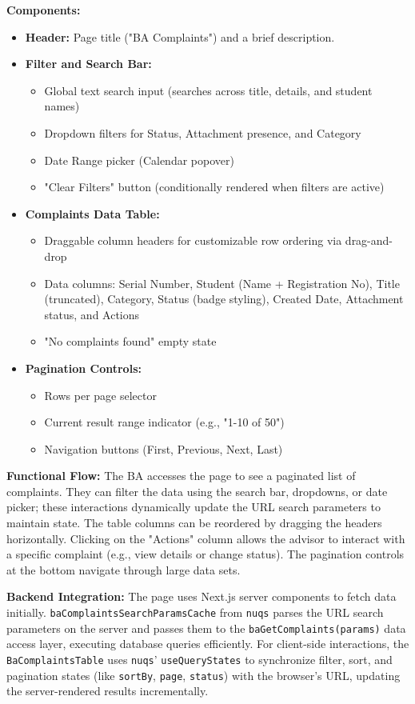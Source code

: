 \textbf{Components:}
\begin{itemize}
    \item \textbf{Header:} Page title ("BA Complaints") and a brief description.
    \item \textbf{Filter and Search Bar:}
    \begin{itemize} \item Global text search input (searches across title, details, and student names) \item Dropdown filters for Status, Attachment presence, and Category \item Date Range picker (Calendar popover) \item "Clear Filters" button (conditionally rendered when filters are active) \end{itemize} \item \textbf{Complaints Data Table:} \begin{itemize} \item Draggable column headers for customizable row ordering via drag-and-drop \item Data columns: Serial Number, Student (Name + Registration No), Title (truncated), Category, Status (badge styling), Created Date, Attachment status, and Actions \item "No complaints found" empty state \end{itemize} \item \textbf{Pagination Controls:} \begin{itemize} \item Rows per page selector \item Current result range indicator (e.g., "1-10 of 50") \item Navigation buttons (First, Previous, Next, Last) \end{itemize} \end{itemize}

\textbf{Functional Flow:} The BA accesses the page to see a paginated list of complaints. They can filter the data using the search bar, dropdowns, or date picker; these interactions dynamically update the URL search parameters to maintain state. The table columns can be reordered by dragging the headers horizontally. Clicking on the "Actions" column allows the advisor to interact with a specific complaint (e.g., view details or change status). The pagination controls at the bottom navigate through large data sets.

\textbf{Backend Integration:} The page uses Next.js server components to fetch data initially. \texttt{baComplaintsSearchParamsCache} from \texttt{nuqs} parses the URL search parameters on the server and passes them to the \texttt{baGetComplaints(params)} data access layer, executing database queries efficiently. For client-side interactions, the \texttt{BaComplaintsTable} uses \texttt{nuqs}' \texttt{useQueryStates} to synchronize filter, sort, and pagination states (like \texttt{sortBy}, \texttt{page}, \texttt{status}) with the browser's URL, updating the server-rendered results incrementally.

